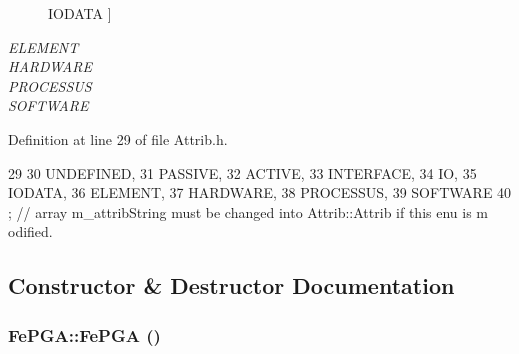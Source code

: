 \begin{Desc}
\begin{description}
{\hypertarget{classAttrib_a69e171d7cc6417835a5a306d3c764235a0af3b0d0ac323c1704e6c69cf90add28}{
IODATA}
\label{classAttrib_a69e171d7cc6417835a5a306d3c764235a0af3b0d0ac323c1704e6c69cf90add28}
}]\item[{\em 
\hypertarget{classAttrib_a69e171d7cc6417835a5a306d3c764235a7788bc5dd333fd8ce18562b269c9dab1}{
ELEMENT}
\label{classAttrib_a69e171d7cc6417835a5a306d3c764235a7788bc5dd333fd8ce18562b269c9dab1}
}]\item[{\em 
\hypertarget{classAttrib_a69e171d7cc6417835a5a306d3c764235a61ceb22149f365f1780d18f9d1459423}{
HARDWARE}
\label{classAttrib_a69e171d7cc6417835a5a306d3c764235a61ceb22149f365f1780d18f9d1459423}
}]\item[{\em 
\hypertarget{classAttrib_a69e171d7cc6417835a5a306d3c764235a75250e29692496e73effca2c0330977f}{
PROCESSUS}
\label{classAttrib_a69e171d7cc6417835a5a306d3c764235a75250e29692496e73effca2c0330977f}
}]\item[{\em 
\hypertarget{classAttrib_a69e171d7cc6417835a5a306d3c764235a103a67cd0b8f07ef478fa45d4356e27b}{
SOFTWARE}
\label{classAttrib_a69e171d7cc6417835a5a306d3c764235a103a67cd0b8f07ef478fa45d4356e27b}
}]\end{description}
\end{Desc}



Definition at line 29 of file Attrib.h.


\begin{DoxyCode}
29                 {
30     UNDEFINED,
31     PASSIVE,
32     ACTIVE,
33     INTERFACE,
34     IO,
35     IODATA,
36     ELEMENT,
37     HARDWARE,
38     PROCESSUS,
39     SOFTWARE 
40   }; // array m_attribString must be changed into Attrib::Attrib if this enu is m
      odified. 
\end{DoxyCode}


\subsection{Constructor \& Destructor Documentation}
\hypertarget{classFePGA_a377ae8860fbb3162e0c49dd08197a670}{
\subsubsection[{FePGA}]{\setlength{\rightskip}{0pt plus 5cm}FePGA::FePGA ()}}
\label{classFePGA_a377ae8860fbb3162e0c49dd08197a670}


